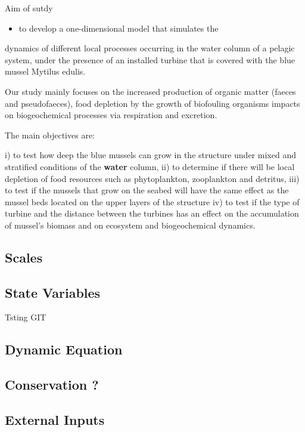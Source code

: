 \documentclass[final,xcolor=dvipsnames]{beamer}
\begin{document}
\begin{frame}
\begin{block}{Aim of sutdy}
\begin{itemize}
    \item to develop a one-dimensional model that simulates the
\end{itemize} 
dynamics of different local processes occurring in the water column of a pelagic
system, under the presence of an installed turbine that is covered with the blue
mussel Mytilus edulis.

Our study mainly focuses on
the increased production of organic matter (faeces and pseudofaeces),
food depletion by the growth of biofouling organisms
impacts on biogeochemical processes via respiration and excretion. 

The main objectives are: 

i) to test how deep the blue mussels can grow in the structure under mixed and stratified conditions of the \textbf<2>{water} column,
ii) to determine if there will be local depletion of food resources
such as phytoplankton, zooplankton and detritus,
iii) to test if the mussels that grow on the seabed will have the same effect as the mussel beds located on the upper layers of the structure iv) to test if the type of turbine and the distance between the turbines has an effect on the accumulation of mussel’s biomass and on ecosystem and biogeochemical dynamics.
\end{block}
\end{frame}

\subsection{Scales}
\subsection{State Variables}

\begin{frame}
 Tsting GIT
\end{frame}

\subsection{Dynamic Equation}
\subsection{Conservation ?}
\subsection{External Inputs}
\end{document}
